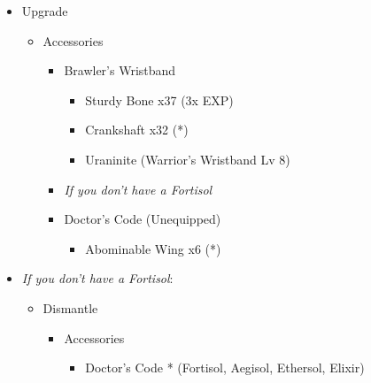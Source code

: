 	\begin{upgrade}
		\begin{itemize}
			\item Upgrade
			      \begin{itemize}
				      \item Accessories
				            \begin{itemize}
					            \item Brawler's Wristband
					                  \begin{itemize}
						                  \item Sturdy Bone x37 (3x EXP)
						                  \item Crankshaft x32 (*)
						                  \item Uraninite (Warrior's Wristband Lv 8)
					                  \end{itemize}
					            \item \textit{If you don't have a Fortisol}
					            \item Doctor's Code (Unequipped)
					                  \begin{itemize}
						                  \item Abominable Wing x6 (*)
					                  \end{itemize}
				            \end{itemize}
			      \end{itemize}
			\item \textit{If you don't have a Fortisol}:
			      \begin{itemize}
				      \item Dismantle
				            \begin{itemize}
					            \item Accessories
					                  \begin{flushleft}
						                  \begin{itemize}
							                  \item Doctor's Code * (Fortisol, Aegisol, Ethersol, Elixir)
						                  \end{itemize}
					                  \end{flushleft}
				            \end{itemize}
			      \end{itemize}
		\end{itemize}
	\end{upgrade}
	\renewcommand{\first}{[1] Guerilla (\rav/\syn/\sab)}
	\renewcommand{\second}{[2] Smart Bomb (\rav/\rav/\sab)}
